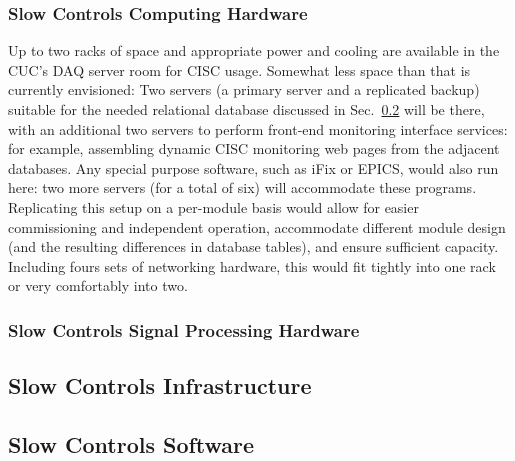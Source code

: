 \subsubsection{Slow Controls Computing Hardware}
\label{sec:fddp-slow-cryo-slow-compute}

Up to two racks of space and appropriate power and cooling are available
in the CUC's DAQ server room for CISC usage.  Somewhat less space than
that is currently envisioned: Two servers (a primary server and a
replicated backup) suitable for the needed relational database discussed
in Sec.~\ref{sec:fddp-slow-cryo-sw} will be there, with an additional
two servers to perform front-end monitoring interface services: for
example, assembling dynamic CISC monitoring web pages from the adjacent
databases.  Any special purpose software, such as iFix or EPICS, would
also run here: two more servers (for a total of six) will accommodate
these programs.
Replicating this setup on a per-module basis would allow for easier
commissioning and independent operation, accommodate different module
design (and the resulting differences in database tables), and ensure
sufficient capacity.  Including fours sets of networking hardware, this
would fit tightly into one rack or very comfortably into two.

\subsubsection{Slow Controls Signal Processing Hardware}
\label{sec:fddp-slow-cryo-slow-dsp}


\subsection{Slow Controls Infrastructure}
\label{sec:fddp-slow-cryo-slow-infra}

\subsection{Slow Controls Software}
\label{sec:fddp-slow-cryo-sw}

